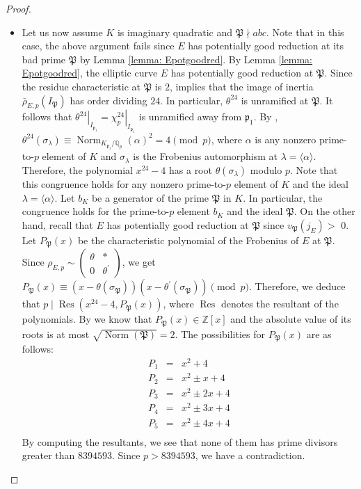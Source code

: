 \documentclass[]{article}
\newcommand {\ZZ}{{\mathbb{Z}}}
\newcommand {\mfp}{{\mathfrak{P}}}
\DeclareMathOperator{\Norm}{Norm}
\begin{document}
\begin{proof}
\begin{enumerate}
\begin{itemize}
    \item Let us now assume $K$ is imaginary quadratic and $\mfp\nmid abc$. Note that in this case, the above argument fails since $E$ has potentially good reduction at its bad prime $\mfp$ by Lemma \ref{lemma: Epotgoodred}. By Lemma \ref{lemma: Epotgoodred}, the elliptic curve $E$ has potentially good reduction at $\mathfrak{P}$. Since the residue characteristic at $\mathfrak{P}$ is $2$, \cite[Section 1, Case $p=2$]{Kraus1990} implies that the image of inertia $\bar{\rho}_{E, p}\left(I_{\mathfrak{P}}\right)$ has order dividing $24$. In particular, $\theta^{24}$ is unramified at $\mathfrak{P}$. It follows that $\left.\theta^{24}\right|_{I_{\mathfrak{p}_1}}=\left.\chi_p^{24}\right|_{I_{\mathfrak{p}_1}}$ is unramified away from $\mathfrak{p}_1$. By \cite[Lemma 4.3]{cturcacs2018fermat}, $\theta^{24}\left(\sigma_{\lambda}\right) \equiv \operatorname{Norm}_{K_{\mathfrak{p}_1} / \mathbb{Q}_p}(\alpha)^2=4 \pmod p$, where $\alpha$ is any nonzero prime-to-$p$ element of $K$ and $\sigma_{\lambda}$ is the Frobenius automorphism at $\lambda=\langle\alpha\rangle$. Therefore, the polynomial $x^{24}-4$ has a root $\theta\left(\sigma_{\lambda}\right)$ modulo $p$. Note that this congruence holds for any nonzero prime-to-$p$ element of $K$ and the ideal $\lambda=\langle\alpha\rangle$. Let $b_K$ be a generator of the prime $\mfp$ in $K$. In particular, the congruence holds for the prime-to-$p$ element $b_K$ and the ideal $\mfp$. On the other hand, recall that $E$ has potentially good reduction at $\mfp$ since $v_\mfp\left(j_E\right)>$ 0. Let $P_\mfp(x)$ be the characteristic polynomial of the Frobenius of $E$ at $\mfp$. Since $\rho_{E,p} \sim\left(\begin{array}{cc}\theta & * \\ 0 & \theta^{\prime}\end{array}\right)$, we get $P_\mfp(x) \equiv\left(x-\theta\left(\sigma_\mfp\right)\right)\left(x-\theta^{\prime}\left(\sigma_\mfp\right)\right)\pmod p$. Therefore, we deduce that $p\mid \operatorname{Res}(x^{24}-4, P_\mfp(x))$, where $\operatorname{Res}$ denotes the resultant of the polynomials. By \cite[Proposition 1.6]{david2011caract} we know that $P_\mfp(x)\in\ZZ[x]$ and the absolute value of its roots is at most $\sqrt{\Norm(\mfp)}=2$. The possibilities for $P_\mfp(x)$ are as follows:
    \begin{eqnarray*}
        P_1&=&x^2+4\\
        P_2&=&x^2\pm x+4\\
        P_3&=&x^2\pm 2x+4\\
        P_4&=&x^2\pm 3x+4\\
        P_5&=&x^2\pm 4x+4\\
        \end{eqnarray*}By computing the resultants, we see that none of them has prime divisors greater than $8394593$. Since $p>8394593$, we have a contradiction.
    
\end{itemize}
\end{enumerate}
\end{proof}
\end{document}

